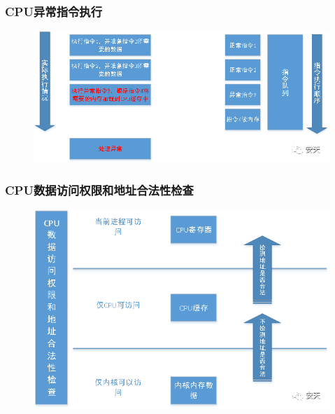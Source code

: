 % 
% 
% 
% 
% 
\begin{frame}
    \frametitle{CPU异常指令执行}
  	\begin{figure}
  	\includegraphics[width=0.8\linewidth]{figs/exception.png}
  	\end{figure}

\end{frame}
% 
% 
% 
\begin{frame}
    \frametitle{CPU数据访问权限和地址合法性检查}
  	\begin{figure}
  	\includegraphics[width=0.8\linewidth]{figs/right-check.png}
  	\end{figure}

\end{frame}
% 
% 
% 
